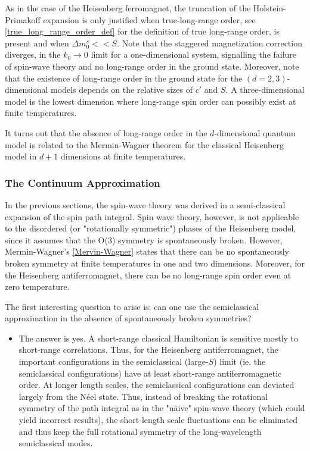 As in the case of the Heisenberg ferromagnet, the truncation of the Holstein-Primakoff expansion is only justified when true-long-range order, see \cref{true_long_range_order_def} for the definition of true long-range order, is present and when $\Delta m_0^s << S$. Note that the staggered magnetization correction diverges, in the $k_0 \rightarrow 0$ limit for a one-dimensional system, signalling the failure of spin-wave theory and no long-range order in the ground state. Moreover, note that the existence of long-range order in the ground state for the $(d=2,3)$-dimensional models depends on the relative sizes of $c'$ and $S$. A three-dimensional model is the lowest dimension where long-range spin order can possibly exist at finite temperatures. \\

\begin{tcolorbox}[colback = yellow, title = Physical Context]

It turns out that the absence of long-range order in the $d$-dimensional quantum model is related to the Mermin-Wagner theorem for the classical Heisenberg model in $d+1$ dimensions at finite temperatures. 

\end{tcolorbox}

\clearpage

\subsubsection{The Continuum Approximation}

In the previous sections, the spin-wave theory was derived in a semi-classical expansion of the spin path integral. Spin wave theory, however, is not applicable to the disordered (or "rotationally symmetric") phases of the Heisenberg model, since it assumes that the O(3) symmetry is spontaneously broken. However, Mermin-Wagner's \cref{Mervin-Wagner} states that there can be no spontaneously broken symmetry at finite temperatures in one and two dimensions. Moreover, for the Heisenberg antiferromagnet, there can be no long-range spin order even at zero temperature. 

The first interesting question to arise is: can one use the semiclassical approximation in the absence of spontaneously broken symmetries? 

\begin{itemize}
    \item The answer is yes. A short-range classical Hamiltonian is sensitive mostly to short-range correlations. Thus, for the Heisenberg antiferromagnet, the important configurations in the semiclassical (large-$S$) limit (ie. the semiclassical configurations) have at least short-range antiferromagnetic order. 
    At longer length scales, the semiclassical configurations can deviated largely from the Néel state. Thus, instead of breaking the rotational symmetry of the path integral as in the "n\"aive" spin-wave theory (which could yield incorrect results), the short-length scale fluctuations can be eliminated and thus keep the full rotational symmetry of the long-wavelength semiclassical modes. \\
\end{itemize}

